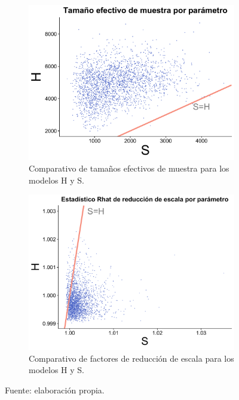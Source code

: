 \begin{figure}[H]
	\centering
	\begin{subfigure}{0.45\textwidth}
	\includegraphics[width = \textwidth]{Figs/Convergencia/Compara_n_eff}
	\caption{Comparativo de tamaños efectivos de muestra para los modelos H y S.}
	\label{fig:N_eff_compara}
	\end{subfigure}
	\begin{subfigure}{0.45\textwidth}
	\includegraphics[width = \textwidth]{Figs/Convergencia/Compara_Rhat}
	\caption{Comparativo de factores de reducción de escala para los modelos H y S.}
	\label{fig:Rhat_compara}
	\end{subfigure}
	\caption{Fuente: elaboración propia.}
\end{figure}
  
